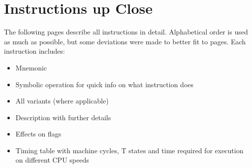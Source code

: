 \documentclass[12pt,twoside,openright,a4paper]{book}
\begin{document}
\chapter{Instructions up Close}
\label{instruction_details}


\newcommand{\DetailParityOverflow}[1]{
	\IfEqCase{#1}
	{
		{p}{
			\small
			\setlength{\unitlength}{0.2mm}
			\begin{picture}(20,10)
				\put(-5.6,7){\circle{20}}
				\put(-11,0){P}
				\put(4,0){V}
			\end{picture}
		}
		{v}{
			\small
			\setlength{\unitlength}{0.2mm}
			\begin{picture}(20,10)
				\put(11,7){\circle{20}}
				\put(-11,0){P}
				\put(4,0){V}
			\end{picture}
		}
		{}{PV}
	}
}
The following pages describe all instructions in detail. Alphabetical order is used as much as possible, but some deviations were made to better fit to pages. Each instruction includes:

\begin{itemize}
	\setlength\itemsep{1pt}
	\item Mnemonic
	\item Symbolic operation for quick info on what instruction does
	\item All variants (where applicable)
	\item Description with further details
	\item Effects on flags
	\item Timing table with machine cycles, T states and time required for execution on different CPU speeds
\end{itemize}
\end{document}
